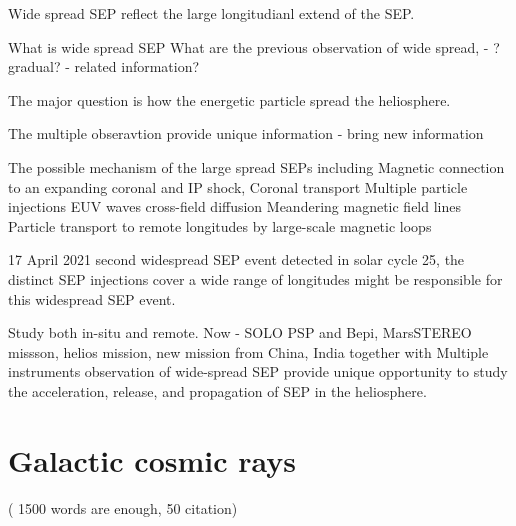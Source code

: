 Wide spread SEP reflect the large longitudianl extend of the SEP.

What is wide spread SEP
What are the previous observation of wide spread, - ? gradual? - related information?

The major question is how the energetic particle spread the heliosphere.

The multiple obseravtion provide unique information - bring new information

The possible mechanism of the large spread SEPs including Magnetic connection to an expanding coronal and IP shock,
Coronal transport
Multiple particle injections
EUV waves
cross-field diffusion
Meandering magnetic field lines
Particle transport to remote longitudes by large-scale magnetic loops

17 April 2021 second widespread SEP event detected in solar cycle 25,
 the distinct SEP injections cover a wide range of longitudes might be responsible for this widespread SEP event.

Study both in-situ and remote.
Now - \ac{SOLO} \ac{PSP} and \ac{Bepi},  MarsSTEREO missson, helios mission, new mission from China, \citet{Wang2020Solarring,}India
together with 
Multiple instruments observation of wide-spread SEP provide unique opportunity to study the acceleration, release, and propagation of SEP in the heliosphere.


\section{Galactic cosmic rays} ( 1500 words are enough, 50 citation)


